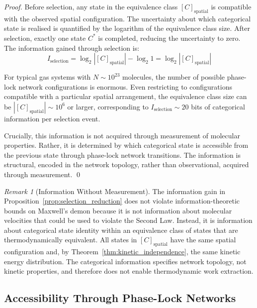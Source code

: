 \documentclass[12pt,a4paper]{article}
\theoremstyle{definition}
\theoremstyle{remark}
\newtheorem{remark}[theorem]{Remark}
\begin{document}
\begin{proof}
Before selection, any state in the equivalence class $[C]_{\text{spatial}}$ is compatible with the observed spatial configuration. The uncertainty about which categorical state is realised is quantified by the logarithm of the equivalence class size. After selection, exactly one state $C^*$ is completed, reducing the uncertainty to zero. The information gained through selection is:
\begin{equation}
I_{\text{selection}} = \log_2 |[C]_{\text{spatial}}| - \log_2 1 = \log_2 |[C]_{\text{spatial}}|
\end{equation}

For typical gas systems with $N \sim 10^{23}$ molecules, the number of possible phase-lock network configurations is enormous. Even restricting to configurations compatible with a particular spatial arrangement, the equivalence class size can be $|[C]_{\text{spatial}}| \sim 10^6$ or larger, corresponding to $I_{\text{selection}} \sim 20$ bits of categorical information per selection event.

Crucially, this information is not acquired through measurement of molecular properties. Rather, it is determined by which categorical state is accessible from the previous state through phase-lock network transitions. The information is structural, encoded in the network topology, rather than observational, acquired through measurement. \qed
\end{proof}

\begin{remark}[Information Without Measurement]
\label{rem:information_without_measurement}
The information gain in Proposition~\ref{prop:selection_reduction} does not violate information-theoretic bounds on Maxwell's demon because it is not information about molecular velocities that could be used to violate the Second Law. Instead, it is information about categorical state identity within an equivalence class of states that are thermodynamically equivalent. All states in $[C]_{\text{spatial}}$ have the same spatial configuration and, by Theorem~\ref{thm:kinetic_independence}, the same kinetic energy distribution. The categorical information specifies network topology, not kinetic properties, and therefore does not enable thermodynamic work extraction.
\end{remark}

\subsection{Accessibility Through Phase-Lock Networks}
\end{document}
